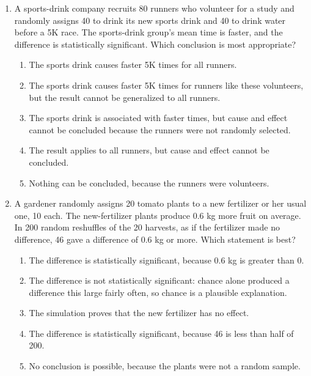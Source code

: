 \documentclass[12pt]{article}
\begin{document}
\begin{enumerate}[leftmargin=1.9em, itemsep=0.10in]

  \item A sports-drink company recruits 80 runners who volunteer for a study and randomly
        assigns 40 to drink its new sports drink and 40 to drink water before a 5K race. The
        sports-drink group's mean time is faster, and the difference is statistically
        significant. Which conclusion is most appropriate?
        \begin{enumerate}[label=\textbf{(\Alph*)}, leftmargin=2.2em, itemsep=1pt]
          \item The sports drink causes faster 5K times for all runners.
          \item The sports drink causes faster 5K times for runners like these volunteers, but
                the result cannot be generalized to all runners.
          \item The sports drink is associated with faster times, but cause and effect cannot
                be concluded because the runners were not randomly selected.
          \item The result applies to all runners, but cause and effect cannot be concluded.
          \item Nothing can be concluded, because the runners were volunteers.
                \hfill{}\rule[-0.2in]{0pt}{0.48in}
        \end{enumerate}

  \item A gardener randomly assigns 20 tomato plants to a new fertilizer or her usual one, 10
        each. The new-fertilizer plants produce 0.6 kg more fruit on average. In 200 random
        reshuffles of the 20 harvests, as if the fertilizer made no difference, 46 gave a
        difference of 0.6 kg or more. Which statement is best?
        \begin{enumerate}[label=\textbf{(\Alph*)}, leftmargin=2.2em, itemsep=1pt]
          \item The difference is statistically significant, because 0.6 kg is greater than 0.
          \item The difference is not statistically significant: chance alone produced a
                difference this large fairly often, so chance is a plausible explanation.
          \item The simulation proves that the new fertilizer has no effect.
          \item The difference is statistically significant, because 46 is less than half of 200.
          \item No conclusion is possible, because the plants were not a random sample.
                \hfill{}\rule[-0.2in]{0pt}{0.48in}
        \end{enumerate}

\end{enumerate}
\end{document}
